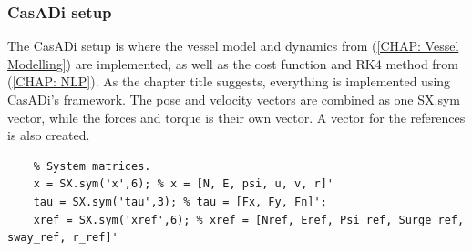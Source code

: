 \subsubsection*{CasADi setup}
The CasADi setup is where the vessel model and dynamics from (\ref{CHAP: Vessel Modelling}) are implemented, as well as the cost function and \gls{RK4}
method from (\ref{CHAP: NLP}). As the chapter title suggests, everything is implemented using CasADi's framework. The pose and velocity vectors
are combined as one SX.sym vector, while the forces and torque is their own vector. A vector for the references is also created.
\begin{lstlisting}
    % System matrices.
    x = SX.sym('x',6); % x = [N, E, psi, u, v, r]'
    tau = SX.sym('tau',3); % tau = [Fx, Fy, Fn]';
    xref = SX.sym('xref',6); % xref = [Nref, Eref, Psi_ref, Surge_ref, sway_ref, r_ref]'
\end{lstlisting}

